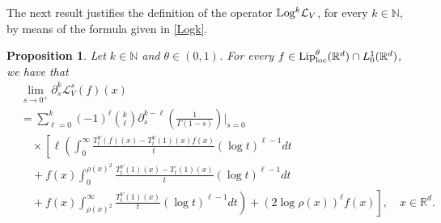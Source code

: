 \documentclass[10pt, a4paper, reqno]{amsart}
\newtheorem{prop}[thm]{Proposition}
\theoremstyle{definition}
\theoremstyle{remark}
\numberwithin{equation}{section}
\begin{document}
The next result justifies the definition of the operator $\mathbb{L}\textup{og}^k\mathcal L_V$, for every $k\in \mathbb N$, by means of the formula given in \eqref{Logk}.
\begin{prop}\label{propoY}\leavevmode
Let $k\in \mathbb N$ and $\theta \in (0,1)$. For every $f\in {\textup{Lip}}_\textup{loc}^\theta (\mathbb R^d)\cap L^1_0(\mathbb R^d)$, we have that
\begin{align}
    &\lim_{s\rightarrow 0^+}\partial _s^k\mathcal L_V^s(f)(x)\nonumber&\\
    &=\sum_{\ell =0}^k(-1)^\ell \binom{k}{\ell }\partial_s^{k-\ell }\left(\frac{1}{\Gamma (1-s)}\right)\Big|_{s=0}\nonumber\\
    &\quad \times\left[\ell \left(\int_0^\infty \frac{T_t^V(f)(x)-T_t^V(1)(x)f(x)}{t}(\log t)^{\ell -1}dt\right.\right.\nonumber\\
    &\quad +f(x)\int_0^{\rho (x)^2}\frac{T_t^V(1)(x)-T_t(1)(x)}{t}(\log t)^{\ell -1}dt\nonumber\\
    &\left. \left.\quad +f(x)\int_{\rho (x)^2}^\infty \frac{T_t^V(1)(x)}{t}(\log t)^{\ell -1}dt\right)+(2\log \rho (x))^\ell f(x)\right],\quad x\in \mathbb R^d.
\end{align}
\end{prop}
\end{document}
